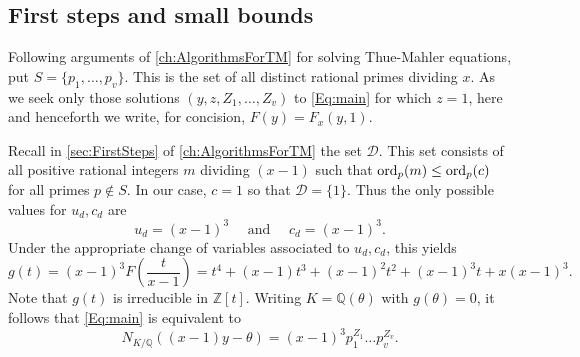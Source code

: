 \subsection{First steps and small bounds}
\label{subsec:FirstStepsSmallBoundsGE}

Following arguments of \autoref{ch:AlgorithmsForTM} for solving  Thue-Mahler equations, put $S = \{p_1, \dots, p_v\}$. This is the set of all distinct rational primes dividing $x$. As we seek only those solutions $(y,z, Z_1, \dots, Z_v)$ to \eqref{Eq:main} for which $z = 1$, here and henceforth we write, for concision, $F(y)=F_x(y,1)$. 

Recall in  \autoref{sec:FirstSteps} of \autoref{ch:AlgorithmsForTM} the set $\mathcal{D}$. This set consists of all positive rational integers $m$ dividing $(x-1)$ such that $\operatorname{ord}_{p}(m) \leq \operatorname{ord}_p(c)$ for all primes $p \notin S$. In our case, $c = 1$ so that $\mathcal{D} = \{1\}$. Thus the only possible values for $u_d,c_d$ are
\[u_d = (x-1)^{3} \quad \text{ and } \quad c_d = (x-1)^3.\]
Under the appropriate change of variables associated to $u_d,c_d$, this yields
$$
g(t) = (x-1)^3F\left(\frac{t}{x-1}\right) = t^4 + (x-1)t^3 + (x-1)^2t^2 + (x-1)^3t + x(x-1)^3.
$$
Note that $g(t)$ is irreducible in $\mathbb{Z}[t]$. Writing $K = \mathbb{Q}(\theta)$ with $g(\theta) = 0$, it follows that
 \eqref{Eq:main} is equivalent to
\begin{equation} \label{Eq:norm}
N_{K/\mathbb{Q}}((x-1)y-\theta) =  (x-1)^{3}p_1^{Z_1}\dots p_v^{Z_v}.
\end{equation}

